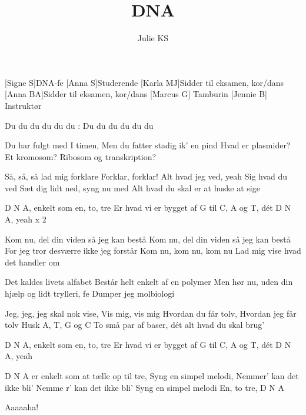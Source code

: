 \documentclass[a4paper,11pt]{article}
\title{DNA}
\author{Julie KS}
\begin{document}
\maketitle

\begin{roles}
[Signe S]DNA-fe
[Anna S]Studerende
[Karla MJ]Sidder til eksamen, kor/dans
[Anna BA]Sidder til eksamen, kor/dans	
[Marcus G] Tamburin
[Jennie B] Instruktør
\end{roles}

\begin{song}


 Du du du du du du
: Du du du du du du 

 Du har fulgt med I timen, 
Men du fatter stadig ik’ en pind
 	Hvad er plasmider? Et kromosom?
Ribosom og transkription?

  Så, så, så lad mig forklare
 	Forklar, forklar!
  Alt hvad jeg ved, yeah
  	Sig hvad du ved
  Sæt dig lidt ned, syng nu med
	Alt hvad du skal er at huske at sige

  D N A, enkelt som en, to, tre
Er hvad vi er bygget af
G til C, A og T, dét D N A, yeah x 2

 Kom nu, del din viden så jeg kan bestå
 Kom nu, del din viden så jeg kan bestå
	For jeg tror desværre ikke jeg forstår
  Kom nu, kom nu, kom nu
Lad mig vise hvad det handler om

  Det kaldes livets alfabet 
	Består helt enkelt af en polymer
  Men hør nu, uden din hjælp og lidt trylleri, fe
Dumper jeg molbiologi

  Jeg, jeg, jeg skal nok vise,
  Vis mig, vis mig
  Hvordan du får tolv,
 	Hvordan jeg får tolv
  Husk A, T,
  	G og C
  To små par af baser, dét alt hvad du skal brug’

  D N A, enkelt som en, to, tre
Er hvad vi er bygget af
G til C, A og T, dét D N A, yeah

  D N A er enkelt som at tælle op til tre,
Syng en simpel melodi,
Nemmer’ kan det ikke bli’
Nemme	r’ kan det ikke bli’
Syng en simpel melodi
En, to tre, D N A

 Aaaaaha!


\end{song}
\end{document}

